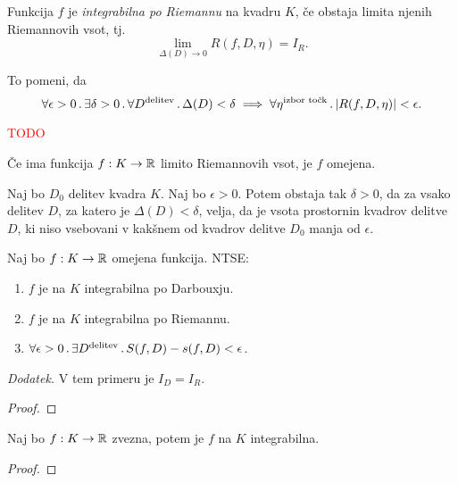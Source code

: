 \begin{definicija}
    Funkcija \(f\) je \emph{integrabilna po Riemannu} na kvadru \(K\), če obstaja limita njenih Riemannovih vsot, tj.
    \[\lim_{\Delta(D) \to 0} R(f, D, \eta) = I_R.\]
\end{definicija}

\begin{opomba}
    To pomeni, da
    \[\forall \epsilon > 0 \,.\, \exists \delta > 0 \,.\, \forall D^\text{delitev} \,.\, \Delta(D) < \delta \implies \forall \eta^\text{izbor točk} \,.\, |R(f, D, \eta)| < \epsilon.\]
\end{opomba}

\begin{zgled}
    \textcolor{red}{TODO}
\end{zgled}

\begin{opomba}
    Če ima funkcija \(f: K \to \mathbb{R}\) limito Riemannovih vsot, je \(f\) omejena.
\end{opomba}

\begin{lema}
    Naj bo \(D_0\) delitev kvadra \(K\). Naj bo \(\epsilon > 0\). Potem obstaja tak \(\delta > 0\), da za vsako delitev \(D\), za katero je \(\Delta(D) < \delta\), velja, da je vsota prostornin kvadrov delitve \(D\), ki niso vsebovani v kakšnem od kvadrov delitve \(D_0\) manja od \(\epsilon\).
\end{lema}

\begin{izrek}
    Naj bo \(f: K \to \mathbb{R}\) omejena funkcija. NTSE:
    \begin{enumerate}
        \item \(f\) je na \(K\) integrabilna po Darbouxju.
        \item \(f\) je na \(K\) integrabilna po Riemannu.
        \item \(\forall \epsilon > 0 \,.\, \exists D^\text{delitev} \,.\, S(f,D) - s(f, D) < \epsilon\).
    \end{enumerate}
    \emph{Dodatek.} V tem primeru je \(I_D = I_R\).
\end{izrek}

\begin{proof}
    \todo{}
\end{proof}

\begin{trditev}
    Naj bo \(f: K \to \mathbb{R}\) zvezna, potem je \(f\) na \(K\) integrabilna.
\end{trditev}

\begin{proof}
    \todo{}
\end{proof}


